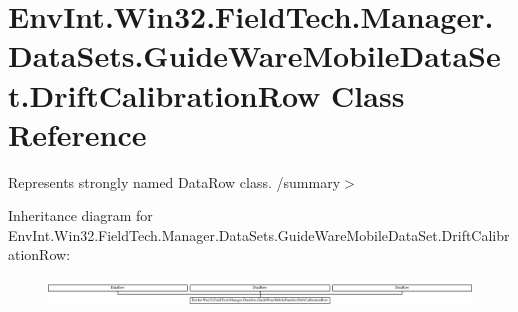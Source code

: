 \hypertarget{class_env_int_1_1_win32_1_1_field_tech_1_1_manager_1_1_data_sets_1_1_guide_ware_mobile_data_set_1_1_drift_calibration_row}{}\section{Env\+Int.\+Win32.\+Field\+Tech.\+Manager.\+Data\+Sets.\+Guide\+Ware\+Mobile\+Data\+Set.\+Drift\+Calibration\+Row Class Reference}
\label{class_env_int_1_1_win32_1_1_field_tech_1_1_manager_1_1_data_sets_1_1_guide_ware_mobile_data_set_1_1_drift_calibration_row}


Represents strongly named Data\+Row class. /summary$>$  


Inheritance diagram for Env\+Int.\+Win32.\+Field\+Tech.\+Manager.\+Data\+Sets.\+Guide\+Ware\+Mobile\+Data\+Set.\+Drift\+Calibration\+Row\+:\begin{figure}[H]
\begin{center}
\leavevmode
\includegraphics[height=0.711111cm]{class_env_int_1_1_win32_1_1_field_tech_1_1_manager_1_1_data_sets_1_1_guide_ware_mobile_data_set_1_1_drift_calibration_row}
\end{center}
\end{figure}
